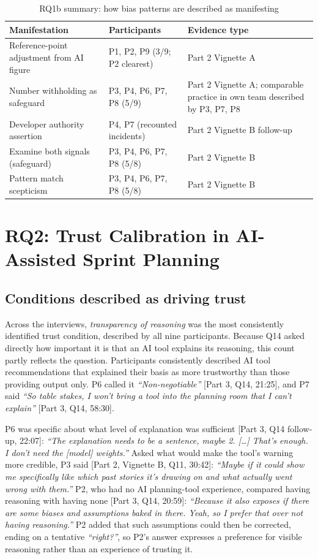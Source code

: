 \documentclass[a4paper,twoside]{bth}
\begin{document}
\begin{table}[htb]
\caption{RQ1b summary: how bias patterns are described as manifesting}
\label{tab:rq1b_summary}
\centering
\small
\begin{tabular}{p{4cm} p{2.6cm} p{4.4cm}}
\toprule
Manifestation & Participants & Evidence type \\
\midrule
Reference-point adjustment from AI figure & P1, P2, P9 (3/9; P2 clearest) & Part 2 Vignette A \\
Number withholding as safeguard & P3, P4, P6, P7, P8 (5/9) & Part 2 Vignette A; comparable practice in own team described by P3, P7, P8 \\
Developer authority assertion & P4, P7 (recounted incidents) & Part 2 Vignette B follow-up \\
Examine both signals (safeguard) & P3, P4, P6, P7, P8 (5/8) & Part 2 Vignette B \\
Pattern match scepticism & P3, P4, P6, P7, P8 (5/8) & Part 2 Vignette B \\
\bottomrule
\end{tabular}
\end{table}

\section{RQ2: Trust Calibration in AI-Assisted Sprint Planning}

\subsection{Conditions described as driving trust}

Across the interviews, \textit{transparency of reasoning} was the most consistently identified trust condition, described by all nine participants. Because Q14 asked directly how important it is that an AI tool explains its reasoning, this count partly reflects the question. Participants consistently described AI tool recommendations that explained their basis as more trustworthy than those providing output only. P6 called it \textit{``Non-negotiable''} [Part 3, Q14, 21:25], and P7 said \textit{``So table stakes, I won't bring a tool into the planning room that I can't explain''} [Part 3, Q14, 58:30].

P6 was specific about what level of explanation was sufficient [Part 3, Q14 follow-up, 22:07]: \textit{``The explanation needs to be a sentence, maybe 2. [\ldots] That's enough. I don't need the [model] weights.''} Asked what would make the tool's warning more credible, P3 said [Part 2, Vignette B, Q11, 30:42]: \textit{``Maybe if it could show me specifically like which past stories it's drawing on and what actually went wrong with them.''} P2, who had no AI planning-tool experience, compared having reasoning with having none [Part 3, Q14, 20:59]: \textit{``Because it also exposes if there are some biases and assumptions baked in there. Yeah, so I prefer that over not having reasoning.''} P2 added that such assumptions could then be corrected, ending on a tentative \textit{``right?''}, so P2's answer expresses a preference for visible reasoning rather than an experience of trusting it.
\end{document}
